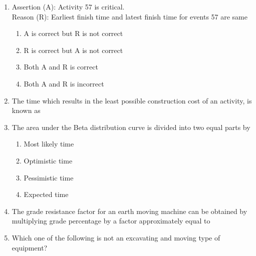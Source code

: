 \documentclass[11pt,a4paper]{article}
\begin{document}
\begin{enumerate}
\begin{enumerate*}[itemjoin=\qquad, label=\Alph*.]
\end{enumerate*}
\item{Assertion (A): Activity 57 is critical. \\
Reason (R): Earliest finish time and latest finish time for events 57 are same}
\begin{enumerate}[label=\Alph*.]
\item{A is correct but R is not correct}
\item{R is correct but A is not correct}
\item{Both A and R is correct}
\item{Both A and R is incorrect}
\end{enumerate}
\item{The time which results in the least possible construction cost of an activity, is known as}
\\
\item{The area under the Beta distribution curve is divided into two equal parts by}
\begin{enumerate}[label=\Alph*.]
\item{Most likely time}
\item{Optimistic time}
\item{Pessimistic time}
\item{Expected time}
\end{enumerate}
\item{The grade resistance factor for an earth moving machine can be obtained by multiplying grade percentage by a factor approximately equal to}
\\
\item{Which one of the following is not an excavating and moving type of equipment?}
\\
\end{enumerate}
\end{document}
